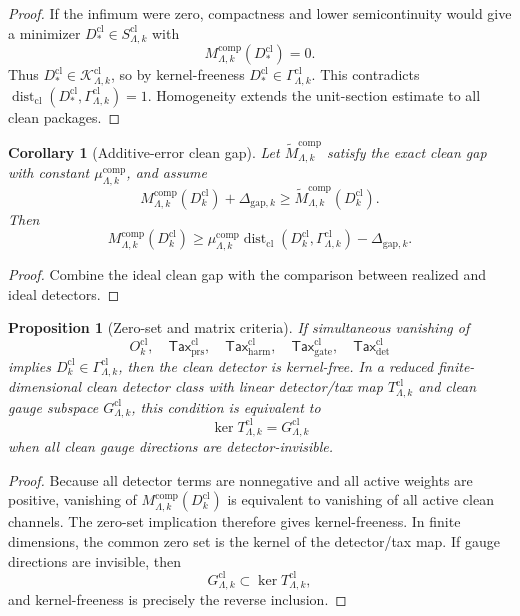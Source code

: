 \documentclass[11pt]{article}
\numberwithin{equation}{section}
\theoremstyle{plain}
\newtheorem{proposition}[theorem]{Proposition}
\newtheorem{corollary}[theorem]{Corollary}
\theoremstyle{definition}
\theoremstyle{remark}
\newcommand{\cl}{\mathrm{cl}}
\newcommand{\comp}{\mathrm{comp}}
\newcommand{\prs}{\mathrm{prs}}
\newcommand{\harm}{\mathrm{harm}}
\newcommand{\gate}{\mathrm{gate}}
\newcommand{\detc}{\mathrm{det}}
\newcommand{\gap}{\mathrm{gap}}
\newcommand{\Tax}{\mathsf{Tax}}
\newcommand{\Dist}{\operatorname{dist}}
\newcommand{\K}{\mathcal K}
\begin{document}
\begin{proof}
If the infimum were zero, compactness and lower semicontinuity would give a
minimizer \(D_*^{\cl}\in S_{\Lambda,k}^{\cl}\) with
\[
  M_{\Lambda,k}^{\comp}(D_*^{\cl})=0.
\]
Thus \(D_*^{\cl}\in\K_{\Lambda,k}^{\cl}\), so by kernel-freeness
\(D_*^{\cl}\in\Gamma_{\Lambda,k}^{\cl}\).  This contradicts
\(\Dist_{\cl}(D_*^{\cl},\Gamma_{\Lambda,k}^{\cl})=1\).  Homogeneity extends the
unit-section estimate to all clean packages.
\end{proof}

\begin{corollary}[Additive-error clean gap]\label{cor:additive-clean-gap}
Let \(\widetilde M_{\Lambda,k}^{\comp}\) satisfy the exact clean gap with
constant \(\mu_{\Lambda,k}^{\comp}\), and assume
\[
  M_{\Lambda,k}^{\comp}(D_k^{\cl})+\Delta_{\gap,k}
  \ge
  \widetilde M_{\Lambda,k}^{\comp}(D_k^{\cl}).
\]
Then
\[
  M_{\Lambda,k}^{\comp}(D_k^{\cl})
  \ge
  \mu_{\Lambda,k}^{\comp}
  \Dist_{\cl}(D_k^{\cl},\Gamma_{\Lambda,k}^{\cl})
  -
  \Delta_{\gap,k}.
\]
\end{corollary}

\begin{proof}
Combine the ideal clean gap with the comparison between realized and ideal
detectors.
\end{proof}

\begin{proposition}[Zero-set and matrix criteria]\label{prop:zero-set-clean}
If simultaneous vanishing of
\[
  O_k^{\cl},\quad
  \Tax_{\prs}^{\cl},\quad
  \Tax_{\harm}^{\cl},\quad
  \Tax_{\gate}^{\cl},\quad
  \Tax_{\detc}^{\cl}
\]
implies \(D_k^{\cl}\in\Gamma_{\Lambda,k}^{\cl}\), then the clean detector is
kernel-free.  In a reduced finite-dimensional clean detector class with
linear detector/tax map \(T_{\Lambda,k}^{\cl}\) and clean gauge subspace
\(G_{\Lambda,k}^{\cl}\), this condition is equivalent to
\[
  \ker T_{\Lambda,k}^{\cl}=G_{\Lambda,k}^{\cl}
\]
when all clean gauge directions are detector-invisible.
\end{proposition}

\begin{proof}
Because all detector terms are nonnegative and all active weights are
positive, vanishing of \(M_{\Lambda,k}^{\comp}(D_k^{\cl})\) is equivalent to
vanishing of all active clean channels.  The zero-set implication therefore
gives kernel-freeness.  In finite dimensions, the common zero set is the
kernel of the detector/tax map.  If gauge directions are invisible, then
\[
  G_{\Lambda,k}^{\cl}\subset\ker T_{\Lambda,k}^{\cl},
\]
and kernel-freeness is precisely the reverse inclusion.
\end{proof}
\end{document}
